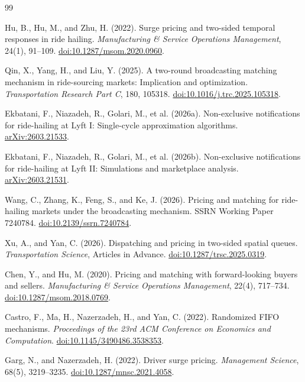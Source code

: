 \documentclass[11pt]{article}
\theoremstyle{definition}
\theoremstyle{remark}
\begin{document}
\begin{thebibliography}{99}

Hu, B., Hu, M., and Zhu, H. (2022).
Surge pricing and two-sided temporal responses in ride hailing.
\emph{Manufacturing \& Service Operations Management}, 24(1), 91--109.
\href{https://doi.org/10.1287/msom.2020.0960}{doi:10.1287/msom.2020.0960}.

Qin, X., Yang, H., and Liu, Y. (2025).
A two-round broadcasting matching mechanism in ride-sourcing markets:
Implication and optimization.
\emph{Transportation Research Part C}, 180, 105318.
\href{https://doi.org/10.1016/j.trc.2025.105318}{doi:10.1016/j.trc.2025.105318}.

Ekbatani, F., Niazadeh, R., Golari, M., et al. (2026a).
Non-exclusive notifications for ride-hailing at Lyft I: Single-cycle
approximation algorithms.
\href{https://arxiv.org/abs/2603.21533}{arXiv:2603.21533}.

Ekbatani, F., Niazadeh, R., Golari, M., et al. (2026b).
Non-exclusive notifications for ride-hailing at Lyft II: Simulations and
marketplace analysis.
\href{https://arxiv.org/abs/2603.21531}{arXiv:2603.21531}.

Wang, C., Zhang, K., Feng, S., and Ke, J. (2026).
Pricing and matching for ride-hailing markets under the broadcasting
mechanism.
SSRN Working Paper 7240784.
\href{https://doi.org/10.2139/ssrn.7240784}{doi:10.2139/ssrn.7240784}.

Xu, A., and Yan, C. (2026).
Dispatching and pricing in two-sided spatial queues.
\emph{Transportation Science}, Articles in Advance.
\href{https://doi.org/10.1287/trsc.2025.0319}{doi:10.1287/trsc.2025.0319}.

Chen, Y., and Hu, M. (2020).
Pricing and matching with forward-looking buyers and sellers.
\emph{Manufacturing \& Service Operations Management}, 22(4), 717--734.
\href{https://doi.org/10.1287/msom.2018.0769}{doi:10.1287/msom.2018.0769}.

Castro, F., Ma, H., Nazerzadeh, H., and Yan, C. (2022).
Randomized FIFO mechanisms.
\emph{Proceedings of the 23rd ACM Conference on Economics and Computation}.
\href{https://doi.org/10.1145/3490486.3538353}{doi:10.1145/3490486.3538353}.

Garg, N., and Nazerzadeh, H. (2022).
Driver surge pricing.
\emph{Management Science}, 68(5), 3219--3235.
\href{https://doi.org/10.1287/mnsc.2021.4058}{doi:10.1287/mnsc.2021.4058}.


\end{thebibliography}
\end{document}
